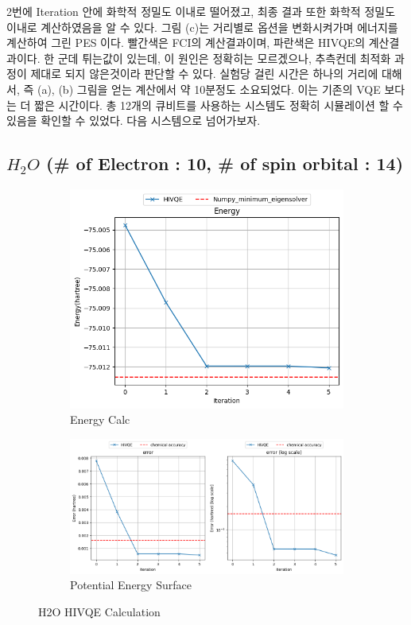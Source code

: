 \documentclass[11pt]{article}
\begin{document}
2번에 Iteration 안에 화학적 정밀도 이내로 떨어졌고, 최종 결과 또한 화학적 정밀도 이내로 계산하였음을 알 수 있다. 
그림 (c)는 거리별로 옵션을 변화시켜가며 에너지를 계산하여 그린 PES 이다. 빨간색은 FCI의 계산결과이며, 파란색은 HIVQE의 계산결과이다. 
한 군데 튀는값이 있는데, 이 원인은 정확히는 모르겠으나, 추측컨데 최적화 과정이 제대로 되지 않은것이라 판단할 수 있다. 
실험당 걸린 시간은 하나의 거리에 대해서, 즉 (a), (b) 그림을 얻는 계산에서 약 10분정도 소요되었다. 이는 기존의 VQE 보다는 더 짧은 시간이다. 
총 12개의 큐비트를 사용하는 시스템도 정확히 시뮬레이션 할 수 있음을 확인할 수 있었다. 다음 시스템으로 넘어가보자. 

\subsection{\(H_2O\) (\# of Electron : 10, \# of spin orbital : 14)}
\begin{figure}[H]
  \centering
  \begin{subfigure}[b]{0.3\textwidth}
    \includegraphics[width=\textwidth]{fig/H2O_E.png}
    \caption{Energy Calc}
    \label{fig:first}
  \end{subfigure}
  \hfill
  \vrule width 1pt  %
  \hfill
  \begin{subfigure}[b]{0.6\textwidth}
    \includegraphics[width=\textwidth]{fig/H2O_dE.png}
    \caption{Potential Energy Surface}
    \label{fig:second}
  \end{subfigure}
  \caption{H2O HIVQE Calculation}
  \label{fig:two_figures_side_by_side}
\end{figure}
\end{document}

